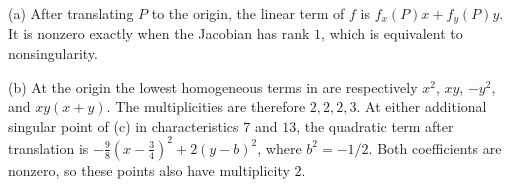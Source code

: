(a) After translating $P$ to the origin, the linear term of $f$ is $f_x(P)x+f_y(P)y$. It is nonzero exactly when the Jacobian has rank $1$, which is equivalent to nonsingularity.

(b) At the origin the lowest homogeneous terms in  are respectively $x^2$, $xy$, $-y^2$, and $xy(x+y)$. The multiplicities are therefore $2,2,2,3$. At either additional singular point of (c) in characteristics $7$ and $13$, the quadratic term after translation is $-\frac98(x-\frac34)^2+2(y-b)^2$, where $b^2=-1/2$. Both coefficients are nonzero, so these points also have multiplicity $2$.
